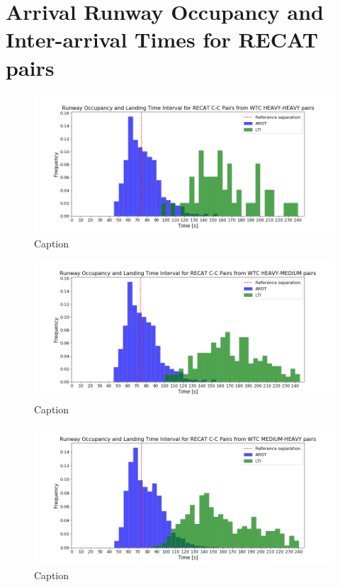 \section{Arrival Runway Occupancy and Inter-arrival Times for RECAT pairs}




\begin{figure}[h]
    \centering
    \includegraphics[width=1\textwidth]{graphics/fig_CC_from_HH_pairs_time_sep.png}
    \caption[list of figures caption]{Caption}
    \label{fig:CC_from_HH_pairs_time_sep}
\end{figure}




\begin{figure}[h]
    \centering
    \includegraphics[width=1\textwidth]{graphics/fig_CC_from_HM_pairs_time_sep.png}
    \caption[list of figures caption]{Caption}
    \label{fig:CC_from_HM_pairs_time_sep}
\end{figure}

\begin{figure}[h]
    \centering
    \includegraphics[width=1\textwidth]{graphics/fig_CC_from_MH_pairs_time_sep.png}
    \caption[list of figures caption]{Caption}
    \label{fig:CC_from_MH_pairs_time_sep}
\end{figure}

